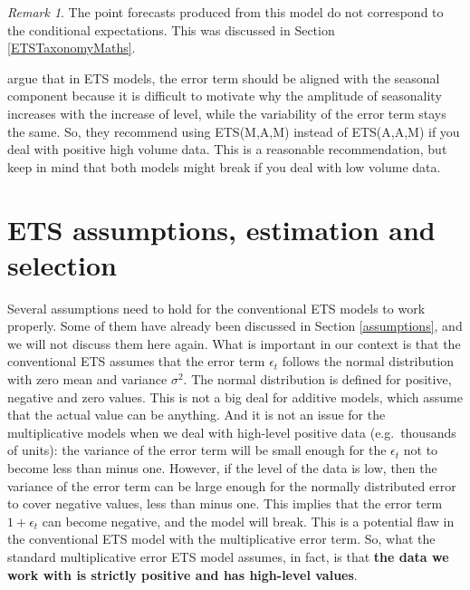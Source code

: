 \documentclass[
]{book}
\theoremstyle{definition}
\theoremstyle{definition}
\theoremstyle{definition}
\theoremstyle{definition}
\theoremstyle{remark}
\newtheorem*{remark}{Remark}
\begin{document}
\begin{remark}
The point forecasts produced from this model do not correspond to the conditional expectations. This was discussed in Section \ref{ETSTaxonomyMaths}.
\end{remark}

\citet{Hyndman2008b} argue that in ETS models, the error term should be aligned with the seasonal component because it is difficult to motivate why the amplitude of seasonality increases with the increase of level, while the variability of the error term stays the same. So, they recommend using ETS(M,A,M) instead of ETS(A,A,M) if you deal with positive high volume data. This is a reasonable recommendation, but keep in mind that both models might break if you deal with low volume data.

\hypertarget{ets-assumptions-estimation-and-selection}{%
\section{ETS assumptions, estimation and selection}\label{ets-assumptions-estimation-and-selection}}

Several assumptions need to hold for the conventional ETS models to work properly. Some of them have already been discussed in Section \ref{assumptions}, and we will not discuss them here again. What is important in our context is that the conventional ETS assumes that the error term \(\epsilon_t\) follows the normal distribution with zero mean and variance \(\sigma^2\). The normal distribution is defined for positive, negative and zero values. This is not a big deal for additive models, which assume that the actual value can be anything. And it is not an issue for the multiplicative models when we deal with high-level positive data (e.g.~thousands of units): the variance of the error term will be small enough for the \(\epsilon_t\) not to become less than minus one. However, if the level of the data is low, then the variance of the error term can be large enough for the normally distributed error to cover negative values, less than minus one. This implies that the error term \(1+\epsilon_t\) can become negative, and the model will break. This is a potential flaw in the conventional ETS model with the multiplicative error term. So, what the standard multiplicative error ETS model assumes, in fact, is that \textbf{the data we work with is strictly positive and has high-level values}.
\end{document}
